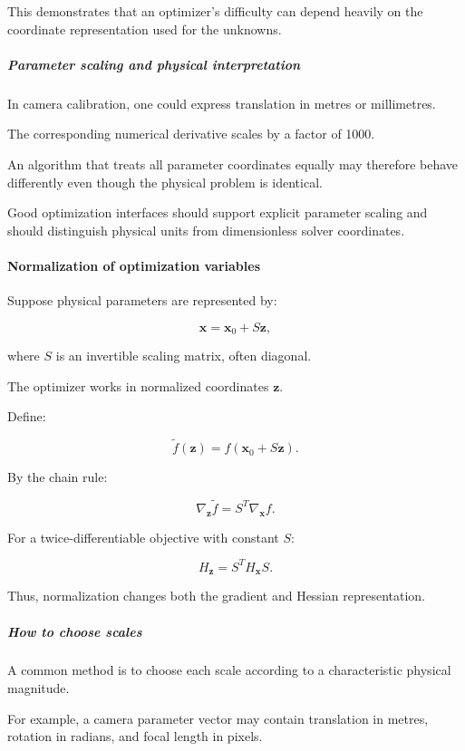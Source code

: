 This demonstrates that an optimizer's difficulty can depend heavily on the coordinate representation used for the unknowns.

\subparagraph{Parameter scaling and physical interpretation}\label{parameter-scaling-and-physical-interpretation}

In camera calibration, one could express translation in metres or millimetres.

The corresponding numerical derivative scales by a factor of 1000.

An algorithm that treats all parameter coordinates equally may therefore behave differently even though the physical problem is identical.

Good optimization interfaces should support explicit parameter scaling and should distinguish physical units from dimensionless solver coordinates.

\paragraph{Normalization of optimization variables}\label{normalization-of-optimization-variables}

Suppose physical parameters are represented by:

\[
\mathbf x=\mathbf x_0+S\mathbf z,
\]

where \(S\) is an invertible scaling matrix, often diagonal.

The optimizer works in normalized coordinates \(\mathbf z\).

Define:

\[
\tilde f(\mathbf z)=f(\mathbf x_0+S\mathbf z).
\]

By the chain rule:

\[
\boxed{ \nabla_{\mathbf z}\tilde f = S^T\nabla_{\mathbf x}f }.
\]

For a twice-differentiable objective with constant \(S\):

\[
\boxed{ H_{\mathbf z}=S^TH_{\mathbf x}S }.
\]

Thus, normalization changes both the gradient and Hessian representation.

\subparagraph{How to choose scales}\label{how-to-choose-scales}

A common method is to choose each scale according to a characteristic physical magnitude.

For example, a camera parameter vector may contain translation in metres, rotation in radians, and focal length in pixels.

